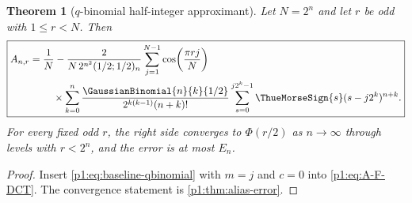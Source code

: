 \documentclass[11pt,oneside]{article}
\newtheorem{theorem}{Theorem}[section]
\theoremstyle{definition}
\theoremstyle{remark}
\newcommand{\PhiU}{\Phi}
\begin{document}
\begin{theorem}[$q$-binomial half-integer approximant]\label{p1:thm:q-approximant}
Let $N=2^n$ and let $r$ be odd with $1\le r<N$.  Then
\begin{equation}\label{p1:eq:q-approximant}
\boxed{
\begin{aligned}
 A_{n,r}={}&\frac1N-
 \frac{2}{N\,2^{n^2}(1/2;1/2)_n}
 \sum_{j=1}^{N-1}\cos\!\left(\frac{\pi rj}{N}\right)\\
 &\quad\times\sum_{k=0}^{n}
 \frac{\GaussianBinomial{n}{k}{1/2}}
 {2^{k(k-1)}(n+k)!}
 \sum_{s=0}^{j2^k-1}\ThueMorseSign{s}(s-j2^k)^{n+k}.
\end{aligned}}
\end{equation}
For every fixed odd $r$, the right side converges to $\PhiU(r/2)$ as
$n\to\infty$ through levels with $r<2^n$, and the error is at most $E_n$.
\end{theorem}

\begin{proof}
Insert \eqref{p1:eq:baseline-qbinomial} with $m=j$ and $c=0$ into
\eqref{p1:eq:A-F-DCT}.  The convergence statement is
\cref{p1:thm:alias-error}.
\end{proof}
\end{document}
